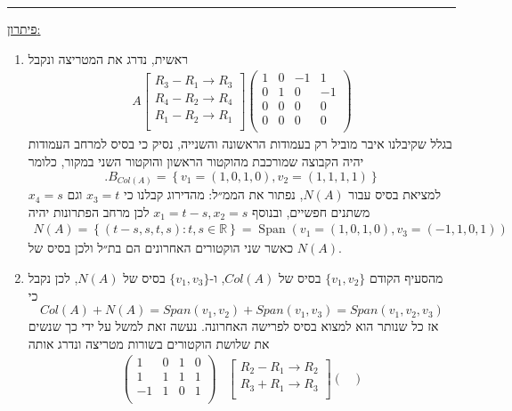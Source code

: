 \documentclass[12pt, a4paper]{article}
\newcommand{\rr}{\mathbb{R}}
\DeclareMathOperator{\Span}{Span}
\begin{document}
\begin{enumerate}
    
    \secondQ
    \noindent\rule{\textwidth-30pt}{0.4pt}
    \underline{פיתרון:}
\begin{enumerate}
    \item 
ראשית, נדרג את המטריצה ונקבל
\begin{align*}
    A
    \begin{bmatrix}
    R_3-R_1\rightarrow R_3\\
    R_4-R_2\rightarrow R_4\\
    R_1-R_2\rightarrow R_1\\
    \end{bmatrix}
    \begin{pmatrix}
        1&0&-1&1\\
        0&1&0&-1\\
        0&0&0&0\\
        0&0&0&0\\
    \end{pmatrix}
\end{align*}
בגלל שקיבלנו איבר מוביל רק בעמודות הראשונה והשנייה, נסיק כי בסיס למרחב העמודות יהיה הקבוצה שמורכבת מהוקטור הראשון והוקטור השני במקור, כלומר
$$.B_{Col(A)}=
\left\{
v_1=(1,0,1,0),
v_2=(1,1,1,1)\right\}$$
למציאת בסיס עבור
$N(A)$,
נפתור את הממ״ל: 
מהדירוג קבלנו כי
$x_3=t$
וגם
$x_4=s$
משתנים חפשיים, ובנוסף
$x_1=t-s, x_2=s$
לכן מרחב הפתרונות יהיה
\begin{align*}
    N(A)=
    \left\{(
        t-s,s,t,s)
  : t,s\in\rr
    \right\}=\Span
    \left(
v_1=(1,0,1,0),
v_3=(-1,1,0,1)
    \right)
\end{align*}
כאשר שני הוקטורים האחרונים הם בת״ל ולכן בסיס של
$N(A)$.
    \item 
מהסעיף הקודם
$\{v_1,v_2\}$
בסיס של
$Col(A)$,
ו-$\{v_1,v_3\}$
בסיס של
$N(A)$,
לכן נקבל כי
$$Col(A)+N(A)=Span(v_1,v_2)+Span(v_1,v_3)=Span(v_1,v_2,v_3)$$
אז כל שנותר הוא למצוא בסיס לפרישה האחרונה. נעשה זאת למשל על ידי כך שנשים את שלושת הוקטורים בשורות מטריצה ונדרג אותה
\begin{align*}
\begin{pmatrix}
    1&0&1&0\\
    1&1&1&1\\
    -1&1&0&1\\
    \end{pmatrix}
&\begin{bmatrix}
    R_2-R_1\rightarrow R_2\\
    R_3+R_1\rightarrow R_3\\
\end{bmatrix}
\begin{pmatrix}

\end{pmatrix}
\end{align*}
\end{enumerate}
\end{enumerate}
\end{document}
